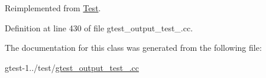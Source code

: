 \-Reimplemented from \hyperlink{classtesting_1_1Test_a931587596081ef8178c2b128facb0411}{\-Test}.



\-Definition at line 430 of file gtest\-\_\-output\-\_\-test\-\_\-.\-cc.




\-The documentation for this class was generated from the following file\-:\begin{DoxyCompactItemize}
\item 
gtest-\/1../test/\hyperlink{gtest__output__test___8cc}{gtest\-\_\-output\-\_\-test\-\_\-.\-cc}\end{DoxyCompactItemize}
